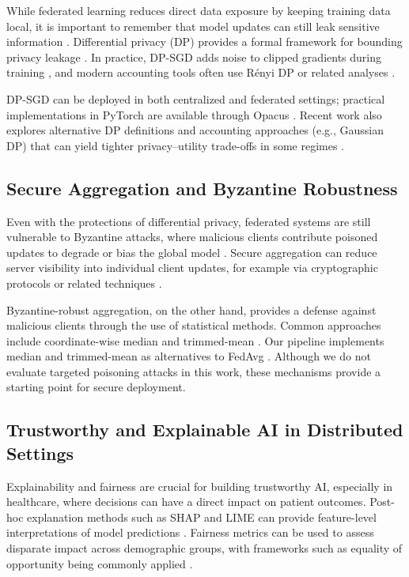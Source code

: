 \documentclass[journal,article,submit,pdftex,moreauthors]{Definitions/mdpi}
\begin{document}
While federated learning reduces direct data exposure by keeping training data local, it is important to remember that model updates can still leak sensitive information \cite{zhu2019deep,shokri2017}. Differential privacy (DP) provides a formal framework for bounding privacy leakage \cite{dwork2006}. In practice, DP-SGD adds noise to clipped gradients during training \cite{abadi2016deep}, and modern accounting tools often use R\'enyi DP or related analyses \cite{mironov2017}.

DP-SGD can be deployed in both centralized and federated settings; practical implementations in PyTorch are available through Opacus \cite{yousefpour2021opacus}. Recent work also explores alternative DP definitions and accounting approaches (e.g., Gaussian DP) that can yield tighter privacy--utility trade-offs in some regimes \cite{bu2020}.

\subsection{Secure Aggregation and Byzantine Robustness}

Even with the protections of differential privacy, federated systems are still vulnerable to Byzantine attacks, where malicious clients contribute poisoned updates to degrade or bias the global model \cite{blanchard2017,yin2018byzantine}. Secure aggregation can reduce server visibility into individual client updates, for example via cryptographic protocols or related techniques \cite{bonawitz2017,zhang2020}.

Byzantine-robust aggregation, on the other hand, provides a defense against malicious clients through the use of statistical methods. Common approaches include coordinate-wise median and trimmed-mean \cite{yin2018byzantine}. Our pipeline implements median and trimmed-mean as alternatives to FedAvg \cite{mcmahan2017}. Although we do not evaluate targeted poisoning attacks in this work, these mechanisms provide a starting point for secure deployment.

\subsection{Trustworthy and Explainable AI in Distributed Settings}

Explainability and fairness are crucial for building trustworthy AI, especially in healthcare, where decisions can have a direct impact on patient outcomes. Post-hoc explanation methods such as SHAP and LIME can provide feature-level interpretations of model predictions \cite{lundberg2017,ribeiro2016}. Fairness metrics can be used to assess disparate impact across demographic groups, with frameworks such as equality of opportunity being commonly applied \cite{hardt2016}.
\end{document}
